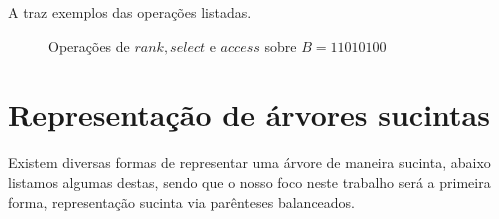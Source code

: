 A  traz exemplos das operações listadas.
\begin{figure}[!ht]
\centering
  \caption[Operações sobre vetores de bits]{Operações de $rank, select$ e $access$ sobre $B=11010100$}
  \label{fig:bitvector-operations}
\end{figure}

\section{Representação de árvores sucintas}
Existem diversas formas de representar  uma árvore de maneira sucinta, abaixo listamos algumas destas, sendo que o nosso foco neste trabalho será a primeira forma, representação sucinta via
parênteses balanceados.
